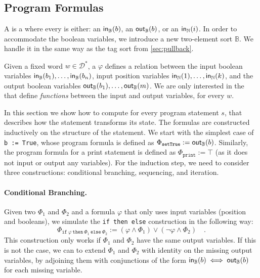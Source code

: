 \subsection{Program Formulas}
\label{sec:program-formulas}

\AP A  is a  where every
 is either: an 
$\mathsf{in}_{\mathbb{B}}(b)$, an  $\mathsf{out}_{\mathbb{B}}(b)$, or an
 $\mathsf{in}_{\mathbb{N}}(i)$. In order to accommodate the
boolean variables, we introduce a new two-element sort $\mathbb{B}$. 
We handle it in the same way as the tag sort from \cref{sec:pullback}.

Given a fixed word $w \in \mathcal{D}^*$, a 
$\varphi$ defines a relation between the input boolean variables
$\mathsf{in}_{\mathbb{B}}(b_1), \dots, \mathsf{in}_{\mathbb{B}}(b_n)$, input position variables
$\mathsf{in}_{\mathbb{N}}(1), \dots, \mathsf{in}_{\mathbb{N}}(k)$, and the output boolean variables
$\mathsf{out}_{\mathbb{B}}(b_1), \dots, \mathsf{out}_{\mathbb{B}}(m)$. We are only interested in the 
that define \emph{functions} between the input and output variables, 
for every $w$.

In this section we show how to compute  for every
program statement $s$, that describes how the statement transforms its state.
The formulas are constructed inductively on the structure of the statement.
We start with the simplest case of \texttt{b := True}, whose program 
formula is defined as $\Phi_{\texttt{setTrue}} := \mathsf{out}_{\mathbb{B}}(b)$.
Similarly, the program formula for a print statement is defined 
as $\Phi_{\texttt{print}} := \top$ (as it does not input or output any variables).
For the induction step, we need to consider three constructions: conditional
branching, sequencing, and iteration.

\paragraph{Conditional Branching.} 
Given two  $\Phi_1$ and $\Phi_2$
and a formula $\varphi$ that only uses input variables (position and booleans), 
we simulate the \texttt{if then else} construction in the following way:
\begin{equation*}
    \Phi_{\texttt{if}~\varphi~\texttt{then}~\Phi_1~\texttt{else}~\Phi_2} := (\varphi \land \Phi_1) \lor (\neg \varphi \land \Phi_2) \quad .
\end{equation*}
This construction only works if $\Phi_1$ and $\Phi_2$ have the same output variables. 
If this is not the case, we can to extend $\Phi_1$ and $\Phi_2$ with 
identity on the missing output variables, by adjoining them
with conjunctions of the form  $\mathsf{in}_{\mathbb{B}}(b) \iff \mathsf{out}_{\mathbb{B}}(b)$
for each missing variable. 

